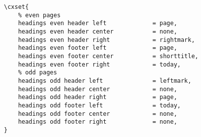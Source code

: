 \begin{verbatim}
\cxset{
    % even pages
    headings even header left             = page,
    headings even header center           = none,
    headings even header right            = rightmark, 
    headings even footer left             = page,
    headings even footer center           = shorttitle,
    headings even footer right            = today,
    % odd pages
    headings odd header left              = leftmark,
    headings odd header center            = none,
    headings odd header right             = page, 
    headings odd footer left              = today,
    headings odd footer center            = none,
    headings odd footer right             = none, 
}
\end{verbatim}


%
%
%
%
%
%
%
%
%
%
%
%
%
%
%
